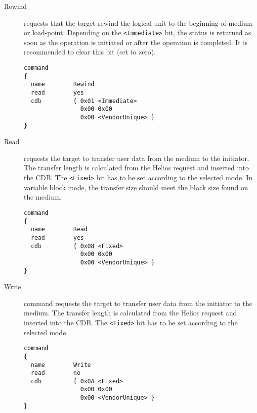 \begin{itemize}
         \begin{description}

           \item[Rewind]
                requests that the target rewind the logical unit to the
                beginning-of-medium or load-point. Depending on the
                {\tt <Immediate>} bit, the status is returned as soon as the
                operation is initiated or after the operation is completed. It
                is recommended to clear this bit (set to zero).

                 \begin{listing}
                   \begin{verbatim}
command
{
  name        Rewind
  read        yes
  cdb         { 0x01 <Immediate>
                0x00 0x00
                0x00 <VendorUnique> }
}
                   \end{verbatim}
                 \end{listing}

           \item[Read] requests the target to transfer user data from the
                medium to the initiator. The transfer length is calculated
                from the Helios request and inserted into the CDB. The
                {\tt <Fixed>} bit has to be set according to the selected
                mode. In variable block mode, the transfer size should meet
                the block size found on the medium.

                 \begin{listing}
                   \begin{verbatim}
command
{
  name        Read
  read        yes
  cdb         { 0x08 <Fixed>
                0x00 0x00
                0x00 <VendorUnique> }
}
                   \end{verbatim}
                 \end{listing}

           \item[Write]
                command requests the target to transfer user data from the
                initiator to the medium. The transfer length is calculated
                from the Helios request and inserted into the CDB. The
                {\tt <Fixed>} bit has to be set according to the selected
                mode.

                 \begin{listing}
                   \begin{verbatim}
command
{
  name        Write
  read        no
  cdb         { 0x0A <Fixed>
                0x00 0x00
                0x00 <VendorUnique> }
}
                   \end{verbatim}
                 \end{listing}


\end{description}
\end{itemize}

